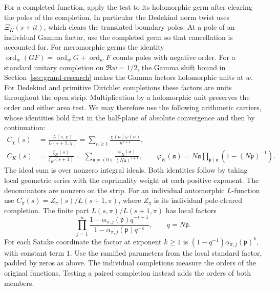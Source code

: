 \documentclass[11pt]{amsart}
\theoremstyle{definition}
\theoremstyle{remark}
\numberwithin{equation}{section}
\begin{document}
For a completed function, apply the test to its holomorphic germ
after clearing the poles of the completion. In particular the
Dedekind norm twist uses \(\Xi_K(s+it)\), which clears the
translated boundary poles. At a pole of an individual Gamma factor,
use the completed germ so that cancellation is accounted for.
For meromorphic germs the identity
\(\operatorname{ord}_w(GF)=\operatorname{ord}_w G+
\operatorname{ord}_w F\) counts poles with negative order.
For a standard unitary completion on \(\Re w=1/2\), the Gamma
shift bound in Section~\ref{sec:grand-research} makes the Gamma
factors holomorphic units at \(w\). For Dedekind and primitive
Dirichlet completions these factors are units throughout the open
strip. Multiplication by a holomorphic unit preserves the order
and either area test. We may therefore use the following arithmetic
carriers, whose identities hold first in the half-plane of absolute
convergence and then by continuation:
\begin{align*}
 C_{\chi}(s)
 &=\frac{L(s,\chi)}{L(s+1,\chi)}
   =\sum_{n\ge1}\frac{\chi(n)\varphi(n)}{n^{s+1}},\\
 C_K(s)
 &=\frac{\zeta_K(s)}{\zeta_K(s+1)}
   =\sum_{\mathfrak a\ne(0)}
     \frac{\varphi_K(\mathfrak a)}{(N\mathfrak a)^{s+1}},
 \qquad
 \varphi_K(\mathfrak a)=N\mathfrak a
         \prod_{\mathfrak p\mid\mathfrak a}(1-(N\mathfrak p)^{-1}).
\end{align*}
The ideal sum is over nonzero integral ideals. Both identities follow
by taking local geometric series with the coprimality weight at each
positive exponent. The denominators are nonzero on the strip. For an
individual automorphic \(L\)-function use
\(C_\pi(s)=Z_\pi(s)/L(s+1,\pi)\), where \(Z_\pi\) is its individual
pole-cleared completion. The finite part \(L(s,\pi)/L(s+1,\pi)\) has local
factors
\[
 \prod_{j=1}^n
   \frac{1-\alpha_{\pi,j}(\mathfrak p)q^{-s-1}}
        {1-\alpha_{\pi,j}(\mathfrak p)q^{-s}},
 \qquad q=N\mathfrak p .
\]
For each Satake coordinate the factor at exponent \(k\ge1\) is
\((1-q^{-1})\alpha_{\pi,j}(\mathfrak p)^k\), with constant term \(1\).
Use the ramified parameters from the local standard factor, padded by
zeros as above. The individual completions measure the orders of the
original functions. Testing a paired completion instead adds the orders
of both members.
\end{document}
